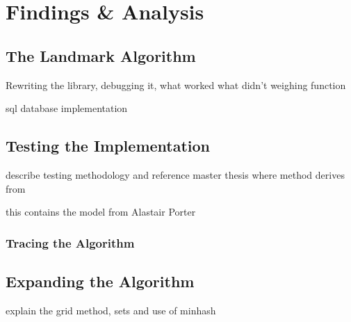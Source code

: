 \ifpdf
    \graphicspath{{X/figures/PNG/}{X/figures/PDF/}{X/figures/}}
\else
    \graphicspath{{X/figures/EPS/}{X/figures/}}
\fi

\chapter{Findings \& Analysis} %

\section{The Landmark Algorithm}

Rewriting the library, debugging it, what worked what didn’t
weighing function

sql database implementation

\section{Testing the Implementation}

describe testing methodology and reference master thesis where method derives from

this contains the model from Alastair Porter

\subsection{Tracing the Algorithm}

\section{Expanding the Algorithm}

explain the grid method, 
sets and use of minhash
